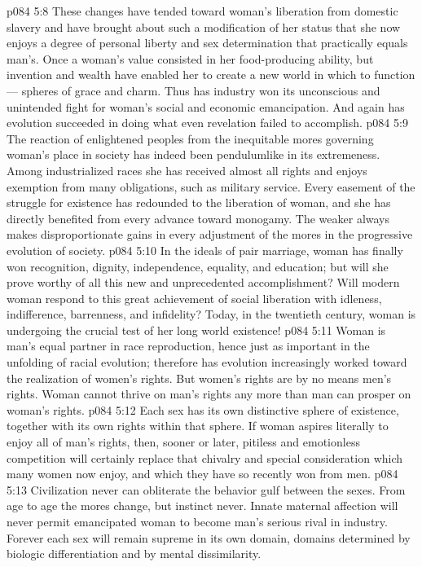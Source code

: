 \vs p084 5:8 These changes have tended toward woman’s liberation from domestic slavery and have brought about such a modification of her status that she now enjoys a degree of personal liberty and sex determination that practically equals man’s. Once a woman’s value consisted in her food\hyp{}producing ability, but invention and wealth have enabled her to create a new world in which to function --- spheres of grace and charm. Thus has industry won its unconscious and unintended fight for woman’s social and economic emancipation. And again has evolution succeeded in doing what even revelation failed to accomplish.
\vs p084 5:9 \pc The reaction of enlightened peoples from the inequitable mores governing woman’s place in society has indeed been pendulumlike in its extremeness. Among industrialized races she has received almost all rights and enjoys exemption from many obligations, such as military service. Every easement of the struggle for existence has redounded to the liberation of woman, and she has directly benefited from every advance toward monogamy. The weaker always makes disproportionate gains in every adjustment of the mores in the progressive evolution of society.
\vs p084 5:10 In the ideals of pair marriage, woman has finally won recognition, dignity, independence, equality, and education; but will she prove worthy of all this new and unprecedented accomplishment? Will modern woman respond to this great achievement of social liberation with idleness, indifference, barrenness, and infidelity? Today, in the twentieth century, woman is undergoing the crucial test of her long world existence!
\vs p084 5:11 Woman is man’s equal partner in race reproduction, hence just as important in the unfolding of racial evolution; therefore has evolution increasingly worked toward the realization of women’s rights. But women’s rights are by no means men’s rights. Woman cannot thrive on man’s rights any more than man can prosper on woman’s rights.
\vs p084 5:12 Each sex has its own distinctive sphere of existence, together with its own rights within that sphere. If woman aspires literally to enjoy all of man’s rights, then, sooner or later, pitiless and emotionless competition will certainly replace that chivalry and special consideration which many women now enjoy, and which they have so recently won from men.
\vs p084 5:13 Civilization never can obliterate the behavior gulf between the sexes. From age to age the mores change, but instinct never. Innate maternal affection will never permit emancipated woman to become man’s serious rival in industry. Forever each sex will remain supreme in its own domain, domains determined by biologic differentiation and by mental dissimilarity.

